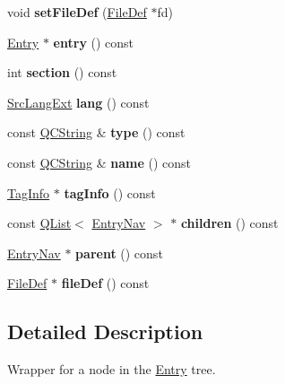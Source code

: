 \begin{DoxyCompactItemize}
void {\bfseries set\+File\+Def} (\mbox{\hyperlink{class_file_def}{File\+Def}} $\ast$fd)
\item 
\mbox{\label{class_entry_nav_a352eaabb8779f01ed7af7b6b44a4d6b5}} 
\mbox{\hyperlink{class_entry}{Entry}} $\ast$ {\bfseries entry} () const
\item 
\mbox{\label{class_entry_nav_a017e4b4723a94477a2cfa6704f9df2bd}} 
int {\bfseries section} () const
\item 
\mbox{\label{class_entry_nav_ad78bdaf9a6c24b7c98d2323b1cfd6613}} 
\mbox{\hyperlink{types_8h_a9974623ce72fc23df5d64426b9178bf2}{Src\+Lang\+Ext}} {\bfseries lang} () const
\item 
\mbox{\label{class_entry_nav_ae85c31066fb152b1d048eda65cecdb15}} 
const \mbox{\hyperlink{class_q_c_string}{Q\+C\+String}} \& {\bfseries type} () const
\item 
\mbox{\label{class_entry_nav_a83b2c64247b0f965a64ea144d158d85d}} 
const \mbox{\hyperlink{class_q_c_string}{Q\+C\+String}} \& {\bfseries name} () const
\item 
\mbox{\label{class_entry_nav_ab312e19785dab8ce9352057ad523cdd7}} 
\mbox{\hyperlink{struct_tag_info}{Tag\+Info}} $\ast$ {\bfseries tag\+Info} () const
\item 
\mbox{\label{class_entry_nav_a439b4aaa88220fadd87e09139801b818}} 
const \mbox{\hyperlink{class_q_list}{Q\+List}}$<$ \mbox{\hyperlink{class_entry_nav}{Entry\+Nav}} $>$ $\ast$ {\bfseries children} () const
\item 
\mbox{\label{class_entry_nav_af41a1ec3e11dbac660f3c8070c529001}} 
\mbox{\hyperlink{class_entry_nav}{Entry\+Nav}} $\ast$ {\bfseries parent} () const
\item 
\mbox{\label{class_entry_nav_a91c3c070006a225ee2e97726eed244ec}} 
\mbox{\hyperlink{class_file_def}{File\+Def}} $\ast$ {\bfseries file\+Def} () const
\end{DoxyCompactItemize}


\subsection{Detailed Description}
Wrapper for a node in the \mbox{\hyperlink{class_entry}{Entry}} tree.

